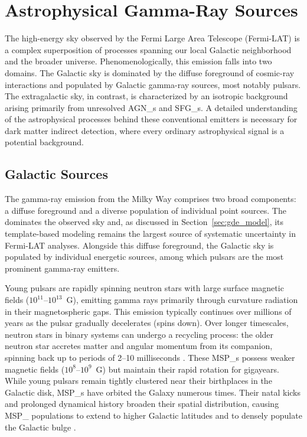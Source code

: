 
\section{Astrophysical Gamma-Ray Sources}
\label{sec:astro_sky}

The high-energy sky observed by the Fermi Large Area Telescope (Fermi-LAT) is a complex superposition of processes spanning our local Galactic neighborhood and the broader universe.
Phenomenologically, this emission falls into two domains.
The Galactic sky is dominated by the diffuse foreground of cosmic-ray interactions and populated by Galactic gamma-ray sources, most notably pulsars.
The extragalactic sky, in contrast, is characterized by an isotropic background arising primarily from unresolved \glspl{AGN_} and \glspl{SFG_}.
A detailed understanding of the astrophysical processes behind these conventional emitters is necessary for dark matter indirect detection, where every ordinary astrophysical signal is a potential background.

\subsection{Galactic Sources}
\label{sec:galactic_sources}

The gamma-ray emission from the Milky Way comprises two broad components: a diffuse foreground and a diverse population of individual point sources.
The \GDE dominates the observed sky and, as discussed in Section~\ref{sec:gde_model}, its template-based modeling remains the largest source of systematic uncertainty in Fermi-LAT analyses.
Alongside this diffuse foreground, the Galactic sky is populated by individual energetic sources, among which pulsars are the most prominent gamma-ray emitters.

Young pulsars are rapidly spinning neutron stars with large surface magnetic fields ($10^{11}$--$10^{13}$~G), emitting gamma rays primarily through curvature radiation in their magnetospheric gaps.
This emission typically continues over millions of years as the pulsar gradually decelerates (spins down).
Over longer timescales, neutron stars in binary systems can undergo a recycling process: the older neutron star accretes matter and angular momentum from its companion, spinning back up to periods of 2--10 milliseconds \cite{1982Natur.300..728A}.
These \glspl{MSP_} possess weaker magnetic fields ($10^8$--$10^9$~G) but maintain their rapid rotation for gigayears.
While young pulsars remain tightly clustered near their birthplaces in the Galactic disk, \glspl{MSP_} have orbited the Galaxy numerous times.
Their natal kicks and prolonged dynamical history broaden their spatial distribution, causing \gls{MSP_} populations to extend to higher Galactic latitudes and to densely populate the Galactic bulge \cite{Calore:2014oga}.

